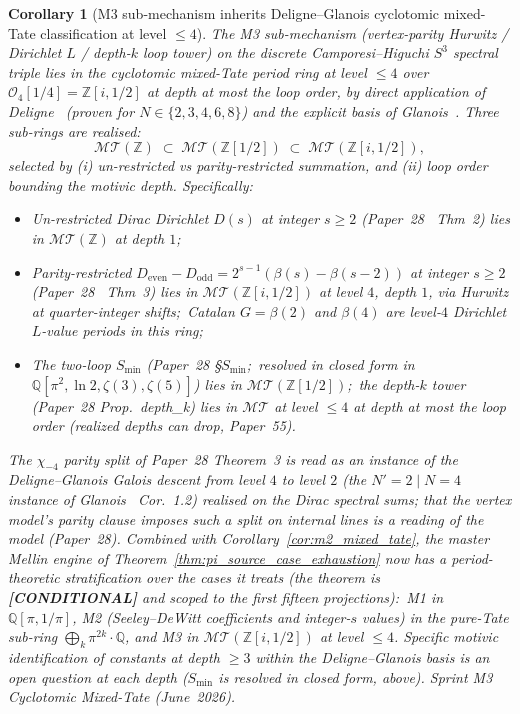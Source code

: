 \documentclass[11pt]{article}
\providecommand{\sthree}{S^3}
\newtheorem{corollary}{Corollary}
\begin{document}
\begin{corollary}[M3 sub-mechanism inherits Deligne--Glanois
cyclotomic mixed-Tate classification at level $\le 4$]
\label{cor:m3_cyclotomic_mixed_tate}
The M3 sub-mechanism (vertex-parity Hurwitz / Dirichlet $L$ /
depth-$k$ loop tower) on the discrete Camporesi--Higuchi $\sthree$
spectral triple lies in the cyclotomic mixed-Tate period ring at
level $\le 4$ over $\mathcal{O}_4[1/4] = \mathbb{Z}[i, 1/2]$ at depth
at most the loop order, by direct application of
Deligne~\cite{deligne2010} (proven for $N \in \{2,3,4,6,8\}$) and the
explicit basis of Glanois~\cite{glanois2015}.  Three sub-rings are
realised:
\begin{equation*}
\mathcal{MT}(\mathbb{Z})
\;\subset\;\mathcal{MT}(\mathbb{Z}[1/2])
\;\subset\;\mathcal{MT}(\mathbb{Z}[i, 1/2]),
\end{equation*}
selected by (i) un-restricted vs parity-restricted summation, and
(ii) loop order bounding the motivic depth.  Specifically:
\begin{itemize}
\item Un-restricted Dirac Dirichlet $D(s)$ at integer $s \ge 2$
      (Paper~28~\cite{paper28} Thm~2) lies in
      $\mathcal{MT}(\mathbb{Z})$ at depth $1$;
\item Parity-restricted $D_{\mathrm{even}} - D_{\mathrm{odd}} =
      2^{s-1}(\beta(s) - \beta(s-2))$ at integer $s \ge 2$
      (Paper~28~\cite{paper28} Thm~3) lies in
      $\mathcal{MT}(\mathbb{Z}[i, 1/2])$ at level $4$, depth $1$, via
      Hurwitz at quarter-integer shifts;\ Catalan $G = \beta(2)$ and
      $\beta(4)$ are level-$4$ Dirichlet $L$-value periods in this
      ring;
\item The two-loop $S_{\min}$ (Paper~28 §$S_{\min}$;\ resolved in
      closed form in $\mathbb{Q}[\pi^2, \ln 2, \zeta(3), \zeta(5)]$) lies in
      $\mathcal{MT}(\mathbb{Z}[1/2])$;\ the depth-$k$ tower (Paper~28
      Prop.~depth\_k) lies in $\mathcal{MT}$ at level $\le 4$ at depth at
      most the loop order (realized depths can drop, Paper~55).
\end{itemize}
The $\chi_{-4}$ parity split of Paper~28 Theorem~3 is read as
an instance of the Deligne--Glanois Galois descent from level $4$ to level $2$
(the $N' = 2 \mid N = 4$ instance of Glanois~\cite{glanois2015} Cor.~1.2) realised on the
Dirac spectral sums; that the vertex model's parity clause imposes such a
split on internal lines is a reading of the model (Paper~28).  Combined with
Corollary~\ref{cor:m2_mixed_tate}, the master Mellin engine of
Theorem~\ref{thm:pi_source_case_exhaustion} now has a
period-theoretic stratification over the cases it treats (the theorem is
\textbf{[CONDITIONAL]} and scoped to the first fifteen projections):\ M1 in $\mathbb{Q}[\pi, 1/\pi]$, M2
(Seeley--DeWitt coefficients and integer-$s$ values) in the pure-Tate
sub-ring $\bigoplus_k \pi^{2k}\cdot\mathbb{Q}$, and
M3 in $\mathcal{MT}(\mathbb{Z}[i, 1/2])$ at level $\le 4$.  Specific
motivic identification of constants at depth $\ge 3$ within the
Deligne--Glanois basis is an open question at each depth ($S_{\min}$ is
resolved in closed form, above).  Sprint M3 Cyclotomic Mixed-Tate
(June~2026).
\end{corollary}
\end{document}

